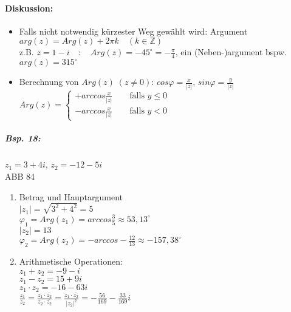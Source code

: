 \paragraph{Diskussion:}
\begin{itemize}
\item Falls nicht notwendig kürzester Weg gewählt wird: Argument $arg(z)= Arg(z) + 2\pi k \quad (k \in \mathbb{Z})$\\
z.B. $z=1-i \quad : \quad Arg(z)=-45^{\circ}=-\frac{\pi}{4}$, ein (Neben-)argument bspw. $arg(z)=315^{\circ}$
\item Berechnung von $Arg(z) \; (z \not = 0)$: $cos \varphi = \frac{x}{|z|}$, $sin\varphi = \frac{y}{|z|}$\\
$\boxed{ Arg (z)= \begin{cases}
+arccos \frac{x}{|z|}\qquad \text{falls } y \leq 0\\
-arccos \frac{x}{|z|} \qquad \text{falls } y < 0
\end{cases}}$
\end{itemize}
\subparagraph{Bsp. 18:} \parskp
$z_1 = 3 + 4i$, $z_2=-12-5i$\\
ABB 84
\begin{enumerate}[label=\alph*.)]
\item Betrag und Hauptargument\\
$|z_1|=\sqrt{3^2+4^2}=5$\\
$\varphi_1 = Arg(z_1) = arccos \frac{3}{5} \approx 53,13 ^{\circ}$\\
$|z_2| = 13$\\
$\varphi_2=Arg(z_2) = - arccos -\frac{12}{13} \approx -157,38 ^{\circ}$
\item Arithmetische Operationen:\\
$z_1 + z_2 = -9 - i$\\
$z_1 - z_2 = 15 + 9 i$\\
$z_1 \cdot z_2 = -16 - 63 i$\\
$\frac{z_1}{z_2}=\frac{z_1 \cdot \overline{z_2}}{z_2 \cdot \overline{z_2}}=\frac{z_1 \cdot \overline{z_2}}{|z_2|^2}=-\frac{56}{169}-\frac{33}{169}i$
\end{enumerate}

